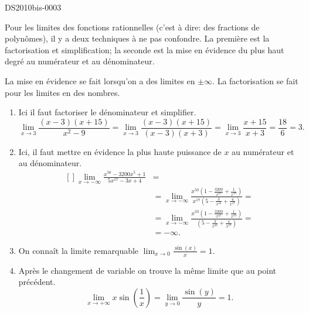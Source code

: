 
\begin{corrige}{DS2010bis-0003}

	Pour les limites des fonctions rationnelles (c'est à dire: des fractions de polynômes), il y a deux techniques à ne pas confondre. La première est la factorisation et simplification; la seconde est la mise en évidence du plus haut degré au numérateur et au dénominateur.

	La mise en évidence se fait lorsqu'on a des limites en $\pm\infty$. La factorisation se fait pour les limites en des nombres.
	\begin{enumerate}
		\item
			Ici il faut factoriser le dénominateur et simplifier.
			\begin{equation}
			\lim_{x\to 3} \frac{(x-3)(x+15)}{x^2-9}	= \lim_{x\to 3} \frac{(x-3)(x+15)}{(x-3)(x+3)}=\lim_{x\to 3} \frac{x+15}{x+3}=\frac{18}{6}=3.
			\end{equation}
		\item
			Ici, il faut mettre en évidence la plus haute puissance de $x$ au numérateur et au dénominateur.
			\begin{equation}
				\begin{aligned}[]
				\lim_{x\to -\infty}\frac{x^{50}-3200x^{5}+1}{5x^{17}-3x+4}&= \\
                                &=\lim_{x\to -\infty}\frac{x^{50}\left(1-\frac{3200}{x^{45}}+\frac{1}{x^{50}}\right)}{x^{17}\left(5-\frac{3}{x^{16}}+\frac{4}{x^{17}}\right)}=\\
                                  &=\lim_{x\to -\infty}\frac{x^{33}\left(1-\frac{3200}{x^{45}}+\frac{1}{x^{50}}\right)}{\left(5-\frac{3}{x^{16}}+\frac{4}{x^{17}}\right)}=\\
                                    &=-\infty.
				\end{aligned}
			\end{equation}
		\item
			On connaît la limite remarquable $\lim_{x\to 0} \frac{ \sin(x) }{ x }=1$. 
		\item
			Après le changement de variable on trouve la même limite que au point précédent.
			\begin{equation}
                            \lim_{x\to +\infty} x \sin (\frac{1}{x})=\lim_{y\to 0} \frac{ \sin(y) }{ y }=1.
			\end{equation}

\end{enumerate}
\end{corrige}
